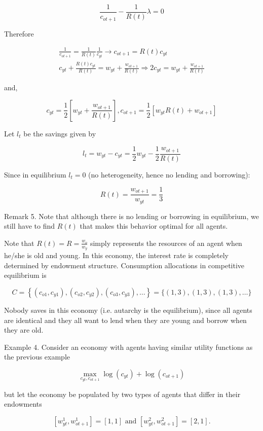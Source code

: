 \documentclass[10pt]{article}
\begin{document}
$$
\frac{1}{c_{o t+1}}-\frac{1}{R(t)} \lambda=0
$$

Therefore

$$
\begin{gathered}
\frac{1}{c_{o t+1}}=\frac{1}{R(t)} \frac{1}{c_{y t}} \rightarrow c_{o t+1}=R(t) c_{y t} \\
c_{y t}+\frac{R(t) c_{y t}}{R(t)}=w_{y t}+\frac{w_{o t+1}}{R(t)} \Rightarrow 2 c_{y t}=w_{y t}+\frac{w_{o t+1}}{R(t)}
\end{gathered}
$$

and,

$$
c_{y t}=\frac{1}{2}\left[w_{y t}+\frac{w_{o t+1}}{R(t)}\right], c_{o t+1}=\frac{1}{2}\left[w_{y t} R(t)+w_{o t+1}\right]
$$

Let $l_{t}$ be the savings given by

$$
l_{t}=w_{y t}-c_{y t}=\frac{1}{2} w_{y t}-\frac{1}{2} \frac{w_{o t+1}}{R(t)}
$$

Since in equilibrium $l_{t}=0$ (no heterogeneity, hence no lending and borrowing):

$$
R(t)=\frac{w_{o t+1}}{w_{y t}}=\frac{1}{3}
$$

Remark 5. Note that although there is no lending or borrowing in equilibrium, we still have to find $R(t)$ that makes this behavior optimal for all agents.

Note that $R(t)=R=\frac{w_{o}}{w_{y}}$ simply represents the resources of an agent when he/she is old and young. In this economy, the interest rate is completely determined by endowment structure. Consumption allocations in competitive equilibrium is

$$
C=\left\{\left(c_{o 1}, c_{y 1}\right),\left(c_{o 2}, c_{y 2}\right),\left(c_{o 3}, c_{y 3}\right), \ldots\right\}=\{(1,3),(1,3),(1,3), \ldots\}
$$

Nobody saves in this economy (i.e. autarchy is the equilibrium), since all agents are identical and they all want to lend when they are young and borrow when they are old.

Example 4. Consider an economy with agents having similar utility functions as the previous example

$$
\max _{c_{y t}, c_{o t+1}} \log \left(c_{y t}\right)+\log \left(c_{o t+1}\right)
$$

but let the economy be populated by two types of agents that differ in their endowments

$$
\left[w_{y t}^{1}, w_{o t+1}^{1}\right]=[1,1] \text { and }\left[w_{y t}^{2}, w_{o t+1}^{2}\right]=[2,1] .
$$
\end{document}

